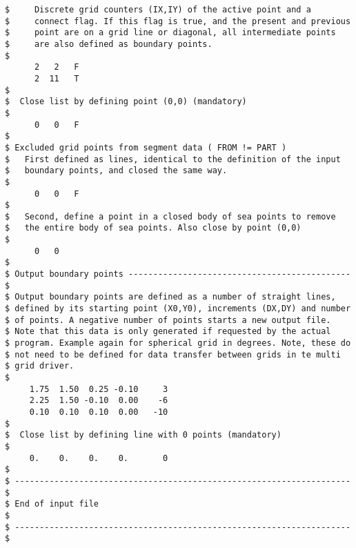 \begin{verbatim}
$     Discrete grid counters (IX,IY) of the active point and a
$     connect flag. If this flag is true, and the present and previous
$     point are on a grid line or diagonal, all intermediate points
$     are also defined as boundary points.
$
      2   2   F
      2  11   T
$
$  Close list by defining point (0,0) (mandatory)
$
      0   0   F
$
$ Excluded grid points from segment data ( FROM != PART )
$   First defined as lines, identical to the definition of the input
$   boundary points, and closed the same way.
$
      0   0   F
$
$   Second, define a point in a closed body of sea points to remove
$   the entire body of sea points. Also close by point (0,0)
$
      0   0
$
$ Output boundary points --------------------------------------------- $
$ Output boundary points are defined as a number of straight lines,
$ defined by its starting point (X0,Y0), increments (DX,DY) and number
$ of points. A negative number of points starts a new output file.
$ Note that this data is only generated if requested by the actual
$ program. Example again for spherical grid in degrees. Note, these do
$ not need to be defined for data transfer between grids in te multi
$ grid driver.
$
     1.75  1.50  0.25 -0.10     3
     2.25  1.50 -0.10  0.00    -6
     0.10  0.10  0.10  0.00   -10
$
$  Close list by defining line with 0 points (mandatory)
$
     0.    0.    0.    0.       0
$
$ -------------------------------------------------------------------- $
$ End of input file                                                    $
$ -------------------------------------------------------------------- $
\end{verbatim}

